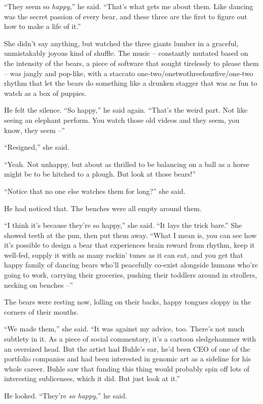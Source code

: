 “They seem so \emph{happy},” he said. “That's what gets me about 
them. Like dancing was the secret passion of every bear, and these 
three are the first to figure out how to make a life of it.”

She didn't say anything, but watched the three giants lumber in a 
graceful, unmistakably joyous kind of shuffle. The music -- constantly 
mutated based on the intensity of the bears, a piece of software that 
sought tirelessly to please them -- was jangly and pop-like, with a 
staccato one-two/\-onetwothreefourfive/\-one-two rhythm that let the 
bears do something like a drunken stagger that was as fun to watch as a 
box of puppies.

He felt the silence. “So happy,” he said again. “That's the weird 
part. Not like seeing an elephant perform. You watch those old videos 
and they seem, you know, they seem --”

“Resigned,” she said.

“Yeah. Not unhappy, but about as thrilled to be balancing on a ball 
as a horse might be to be hitched to a plough. But look at those 
bears!”

“Notice that no one else watches them for long?” she said.

He had noticed that. The benches were all empty around them.

“I think it's because they're so happy,” she said. “It lays the 
trick bare.” She showed teeth at the pun, then put them away. “What 
I mean is, you can see how it's possible to design a bear that 
experiences brain reward from rhythm, keep it well-fed, supply it with 
as many rockin' tunes as it can eat, and you get that happy family of 
dancing bears who'll peacefully co-exist alongside humans who're going 
to work, carrying their groceries, pushing their toddlers around in 
strollers, necking on benches --”

The bears were resting now, lolling on their backs, happy tongues 
sloppy in the corners of their mouths.

“We made them,” she said. “It was against my advice, too. There's 
not much subtlety in it. As a piece of social commentary, it's a 
cartoon sledgehammer with an oversized head. But the artist had Buhle's 
ear, he'd been CEO of one of the portfolio companies and had been 
interested in genomic art as a sideline for his whole career. Buhle saw 
that funding this thing would probably spin off lots of interesting 
sublicenses, which it did. But just look at it.”

He looked. “They're \emph{so happy},” he said.

